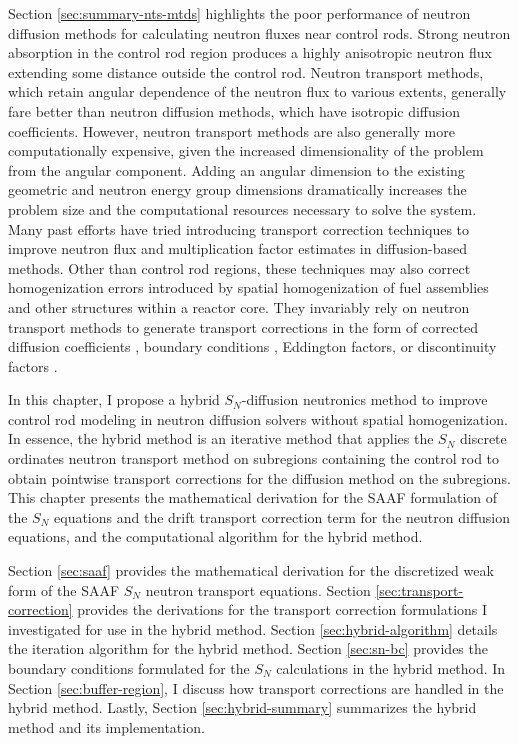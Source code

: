 Section \ref{sec:summary-nts-mtds} highlights the poor performance of neutron diffusion
methods for calculating neutron fluxes near control rods. Strong neutron absorption in the control
rod region produces a highly anisotropic neutron flux extending some distance outside the control
rod. Neutron transport methods, which retain angular dependence of the neutron flux to various
extents, generally fare better than neutron diffusion methods, which have isotropic diffusion
coefficients. However, neutron transport methods are also generally more computationally expensive,
given the increased dimensionality of the problem from the angular component. Adding an angular
dimension to the existing geometric and neutron energy group dimensions dramatically
increases the problem size and the computational resources necessary to solve the system. Many past
efforts have tried introducing
transport correction techniques to improve neutron flux and multiplication factor estimates in
diffusion-based methods. Other than control rod regions, these techniques may also correct
homogenization errors introduced by spatial homogenization of fuel assemblies and other
structures within a reactor core. They invariably rely on neutron transport methods to generate
transport corrections in the form of corrected diffusion coefficients
\cite{bretscher_computing_1997, scherer_determination_1976, ronen_accurate_2004,
pounders_diffusion_2009, kavenoky_sph_1978}, boundary conditions \cite{davison_influence_1951,
pellaud_extrapolation_1968, fen_modelling_1992}, Eddington factors, or discontinuity factors
\cite{koebke_new_1980}.

In this chapter, I propose a hybrid $S_N$-diffusion neutronics method to improve control rod
modeling in neutron diffusion solvers without spatial homogenization. In essence, the hybrid
method is an iterative method that applies
the $S_N$ discrete ordinates neutron transport method on subregions containing the control rod to
obtain pointwise transport corrections for the diffusion method on the subregions.
This chapter presents the mathematical derivation for the
\gls{SAAF} formulation of the $S_N$ equations and the drift transport correction term for the
neutron diffusion equations, and the computational algorithm for the hybrid method.

Section \ref{sec:saaf} provides the mathematical derivation for the discretized weak form of the
\gls{SAAF} $S_N$ neutron transport equations. Section \ref{sec:transport-correction} provides the
derivations for the transport correction formulations I investigated for use in the hybrid method.
Section \ref{sec:hybrid-algorithm} details the iteration algorithm for the hybrid method. Section
\ref{sec:sn-bc} provides the boundary conditions formulated for the $S_N$ calculations in the
hybrid method. In Section \ref{sec:buffer-region}, I discuss how transport corrections are handled
in the hybrid method. Lastly, Section \ref{sec:hybrid-summary} summarizes the hybrid method and its
implementation.

